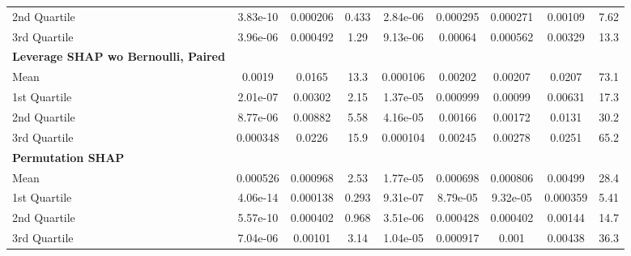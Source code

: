 {\begin{tabular} {lcccccccc}
\hspace{7pt}2nd Quartile & 3.83e-10 & \cellcolor{silver!60}0.000206 & \cellcolor{silver!60}0.433 & \cellcolor{bronze!60}2.84e-06 & \cellcolor{gold!60}0.000295 & \cellcolor{silver!60}0.000271 & \cellcolor{gold!60}0.00109 & \cellcolor{gold!60}7.62 \\ 
\hspace{7pt}3rd Quartile & 3.96e-06 & \cellcolor{silver!60}0.000492 & \cellcolor{silver!60}1.29 & \cellcolor{bronze!60}9.13e-06 & \cellcolor{silver!60}0.00064 & \cellcolor{silver!60}0.000562 & \cellcolor{gold!60}0.00329 & \cellcolor{gold!60}13.3 \\ 
\addlinespace[1ex] 
\textbf{Leverage SHAP wo Bernoulli, Paired} &  &  &  &  &  &  &  &  \\ 
\hspace{7pt}Mean & 0.0019 & 0.0165 & 13.3 & 0.000106 & 0.00202 & 0.00207 & 0.0207 & 73.1 \\ 
\hspace{7pt}1st Quartile & 2.01e-07 & 0.00302 & 2.15 & 1.37e-05 & 0.000999 & 0.00099 & 0.00631 & 17.3 \\ 
\hspace{7pt}2nd Quartile & 8.77e-06 & 0.00882 & 5.58 & 4.16e-05 & 0.00166 & 0.00172 & 0.0131 & 30.2 \\ 
\hspace{7pt}3rd Quartile & 0.000348 & 0.0226 & 15.9 & 0.000104 & 0.00245 & 0.00278 & 0.0251 & 65.2 \\ 
\addlinespace[1ex] 
\textbf{Permutation SHAP} &  &  &  &  &  &  &  &  \\ 
\hspace{7pt}Mean & 0.000526 & 0.000968 & 2.53 & 1.77e-05 & 0.000698 & 0.000806 & \cellcolor{bronze!60}0.00499 & 28.4 \\ 
\hspace{7pt}1st Quartile & 4.06e-14 & 0.000138 & 0.293 & 9.31e-07 & \cellcolor{gold!60}8.79e-05 & \cellcolor{gold!60}9.32e-05 & \cellcolor{bronze!60}0.000359 & \cellcolor{bronze!60}5.41 \\ 
\hspace{7pt}2nd Quartile & 5.57e-10 & 0.000402 & 0.968 & 3.51e-06 & \cellcolor{bronze!60}0.000428 & 0.000402 & \cellcolor{silver!60}0.00144 & 14.7 \\ 
\hspace{7pt}3rd Quartile & 7.04e-06 & 0.00101 & 3.14 & 1.04e-05 & \cellcolor{bronze!60}0.000917 & 0.001 & \cellcolor{bronze!60}0.00438 & 36.3 \\ 
\bottomrule
\end{tabular}}